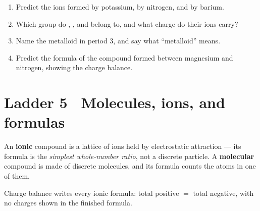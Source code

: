\documentclass{apchem-worksheet}
\begin{document}
\begin{yourturn}
\begin{enumerate}[leftmargin=*,itemsep=0.5em]
  \item Predict the ions formed by potassium, by nitrogen, and by
        barium. \workspace[1.6cm]
  \item Which group do , , and  belong to, and what
        charge do their ions carry? \workspace[1.4cm]
  \item Name the metalloid in period 3, and say what ``metalloid'' means.
        \workspace[1.6cm]
  \item Predict the formula of the compound formed between magnesium and
        nitrogen, showing the charge balance. \workspace[1.8cm]
\end{enumerate}
\end{yourturn}

\section*{\sffamily Ladder 5 \textbullet\ Molecules, ions, and formulas}

An \textbf{ionic} compound is a lattice of ions held by electrostatic
attraction --- its formula is the \emph{simplest whole-number ratio}, not
a discrete particle. A \textbf{molecular} compound is made of discrete
molecules, and its formula counts the atoms in one of them.

Charge balance writes every ionic formula: total positive $=$ total
negative, with no charges shown in the finished formula.
\end{document}

